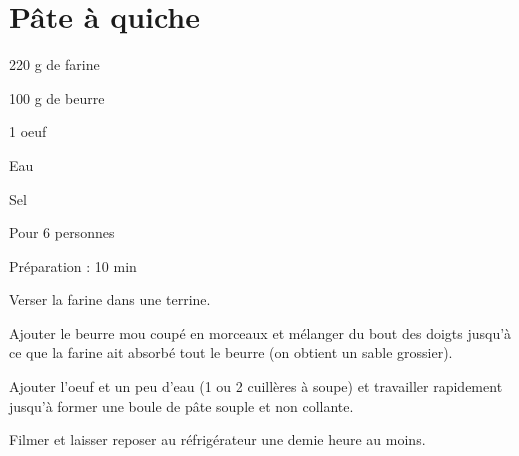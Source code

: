 \section[\normalsize{P\^ate \`a quiche}]{P\^ate \`a quiche}

\begin{ingredients}
\item 220 g de farine
\item 100 g de beurre
\item 1 oeuf
\item Eau
\item Sel
\end{ingredients}
\begin{infos}
\item Pour 6 personnes
\item Préparation : 10 min
\end{infos}
\begin{etapes}
\item Verser la farine dans une terrine. 
\item Ajouter le beurre mou coup\'e en morceaux et m\'elanger du bout des doigts jusqu'\`a ce que la farine ait absorb\'e tout le beurre (on obtient un sable grossier). 
\item Ajouter l'oeuf et un peu d'eau (1 ou 2 cuill\`eres \`a soupe) et travailler rapidement jusqu'\`a former une boule de p\^ate souple et non collante. 
\item Filmer et laisser reposer au r\'efrig\'erateur une demie heure au moins.
\end{etapes}
\begin{conseils}
\end{conseils}
